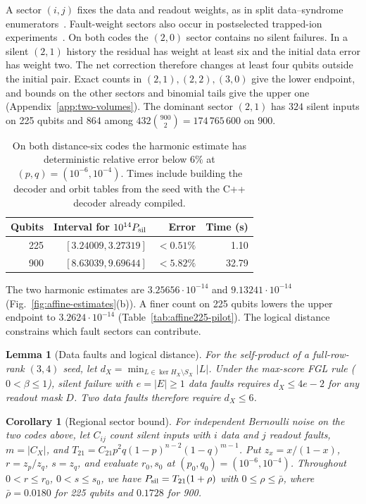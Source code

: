 \documentclass[10pt,twocolumn]{article}
\newtheorem{corollary}[theorem]{Corollary}
\newtheorem{lemma}[theorem]{Lemma}
\theoremstyle{definition}
\begin{document}
A sector $(i,j)$ fixes the data and readout weights, as in split
data--syndrome enumerators~\cite[Sec.~V]{ALB20}. Fault-weight sectors
also occur in postselected trapped-ion experiments~\cite{Linke17}.
On both codes the $(2,0)$ sector contains no silent failures. In a silent $(2,1)$
history the residual has weight at least six and the initial data error
has weight two. The net correction therefore changes at least four
qubits outside the initial pair. Exact counts in $(2,1),(2,2),(3,0)$
give the lower endpoint, and bounds on the other
sectors and binomial tails give the upper one
(Appendix~\ref{app:two-volumes}). The dominant sector $(2,1)$ has
$324$ silent inputs on 225 qubits and $864$ among
$432\binom{900}{2}=174\,765\,600$ on 900.

\begin{table}[!htb]
\centering\small
\setlength{\tabcolsep}{3pt}
\caption{On both distance-six codes the harmonic estimate has
deterministic relative error below $6\%$ at $(p,q)=(10^{-6},10^{-4})$.
Times include building the decoder and orbit tables from the seed
with the C++ decoder already compiled.}
\label{tab:two-volumes}
\smallskip
\begin{tabular}{@{}rrrr@{}}
\toprule
Qubits & Interval for $10^{14}P_{\rm sil}$ & Error & Time (s)\\
\midrule
225 & $[3.24009,3.27319]$ & $<0.51\%$ & 1.10\\
900 & $[8.63039,9.69644]$ & $<5.82\%$ & 32.79\\
\bottomrule
\end{tabular}
\end{table}

The two harmonic estimates are $3.25656\cdot10^{-14}$ and
$9.13241\cdot10^{-14}$ (Fig.~\ref{fig:affine-estimates}(b)). A
finer count on 225 qubits lowers the upper endpoint to
$3.2624\cdot10^{-14}$ (Table~\ref{tab:affine225-pilot}). The logical
distance constrains which fault sectors can contribute.

\begin{lemma}[Data faults and logical distance]\label{lem:data-fault-distance}
For the self-product of a full-row-rank $(3,4)$ seed, let $d_X=\min_{L\in\ker H_X\setminus S_X}|L|$.
Under the max-score FGL rule ($0<\beta\le1$), silent failure with $e=|E|\ge1$ data faults requires $d_X\le4e-2$ for any readout mask $D$. Two data faults therefore require $d_X\le6$.
\end{lemma}

\begin{corollary}[Regional sector bound]\label{cor:regional-sector}
For independent Bernoulli noise on the two codes above, let $C_{ij}$ count silent inputs with $i$ data and $j$ readout faults, $m=|C_X|$, and
$T_{21}=C_{21}p^2q(1-p)^{n-2}(1-q)^{m-1}$. Put $z_x=x/(1-x)$, $r=z_p/z_q$, $s=z_q$, and evaluate $r_0,s_0$ at $(p_0,q_0)=(10^{-6},10^{-4})$.
Throughout $0<r\le r_0$, $0<s\le s_0$, we have $P_{\rm sil}=T_{21}(1+\rho)$ with $0\le\rho\le\bar\rho$, where $\bar\rho=0.0180$ for 225 qubits and $0.1728$ for 900.
\end{corollary}
\end{document}
